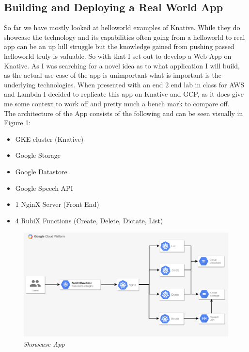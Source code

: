 \subsection{Building and Deploying a Real World App}
So far we have mostly looked at helloworld examples of Knative. While they do showcase the technology and its capabilities often going from a helloworld to real app can be an up hill struggle but the knowledge gained from pushing passed helloworld truly is valuable. So with that I set out to develop a Web App on Knative. As I was searching for a novel idea as to what application I will build, as the actual use case of the app is unimportant what is important is the underlying technologies. When presented with an end 2 end lab in class for AWS and Lambda I decided to replicate this app on Knative and GCP, as it does give me some context to work off and pretty much a bench mark to compare off.
\\The architecture of the App consists of the following and can be seen visually in Figure \ref{img:showapp}:
\begin{itemize}
    \item GKE cluster (Knative)
    \item Google Storage
    \item Google Datastore
    \item Google Speech API
    \item 1 NginX Server (Front End)
    \item 4 RubiX Functions (Create, Delete, Dictate, List)
\end{itemize}
\begin{figure}[!ht]
\centering
\includegraphics*[width=1\textwidth]{images/showcase-api-3.png}
\caption{\em Showcase App}
\label{img:showapp}
\end{figure}
